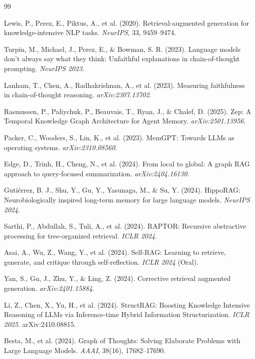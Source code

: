 \begin{thebibliography}{99}

Lewis, P., Perez, E., Piktus, A., et al. (2020).
Retrieval-augmented generation for knowledge-intensive NLP tasks.
\textit{NeurIPS}, 33, 9459--9474.

Turpin, M., Michael, J., Perez, E., \& Bowman, S. R. (2023).
Language models don't always say what they think: Unfaithful explanations in chain-of-thought prompting.
\textit{NeurIPS 2023}.

Lanham, T., Chen, A., Radhakrishnan, A., et al. (2023).
Measuring faithfulness in chain-of-thought reasoning.
\textit{arXiv:2307.13702}.

Rasmussen, P., Paliychuk, P., Beauvais, T., Ryan, J., \& Chalef, D. (2025).
Zep: A Temporal Knowledge Graph Architecture for Agent Memory.
\textit{arXiv:2501.13956}.

Packer, C., Wooders, S., Lin, K., et al. (2023).
MemGPT: Towards LLMs as operating systems.
\textit{arXiv:2310.08560}.

Edge, D., Trinh, H., Cheng, N., et al. (2024).
From local to global: A graph RAG approach to query-focused summarization.
\textit{arXiv:2404.16130}.

Guti\'errez, B. J., Shu, Y., Gu, Y., Yasunaga, M., \& Su, Y. (2024).
HippoRAG: Neurobiologically inspired long-term memory for large language models.
\textit{NeurIPS 2024}.

Sarthi, P., Abdullah, S., Tuli, A., et al. (2024).
RAPTOR: Recursive abstractive processing for tree-organized retrieval.
\textit{ICLR 2024}.

Asai, A., Wu, Z., Wang, Y., et al. (2024).
Self-RAG: Learning to retrieve, generate, and critique through self-reflection.
\textit{ICLR 2024} (Oral).

Yan, S., Gu, J., Zhu, Y., \& Ling, Z. (2024).
Corrective retrieval augmented generation.
\textit{arXiv:2401.15884}.

Li, Z., Chen, X., Yu, H., et al. (2024).
StructRAG: Boosting Knowledge Intensive Reasoning of LLMs via Inference-time Hybrid Information Structurization.
\textit{ICLR 2025}. arXiv:2410.08815.

Besta, M., et al. (2024).
Graph of Thoughts: Solving Elaborate Problems with Large Language Models.
\textit{AAAI}, 38(16), 17682--17690.


\end{thebibliography}
